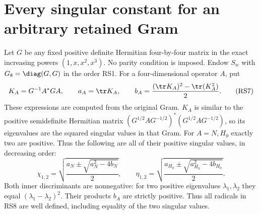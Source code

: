 \section{Every singular constant for an arbitrary retained Gram}
Let $G$ be any fixed positive definite Hermitian four-by-four
matrix in the exact increasing powers $(1,x,x^2,x^3)$.
No parity condition is imposed. Endow $S_w$ with
$G_8=\diag(G,G)$ in the order RS1. For a four-dimensional
operator $A$, put
\begin{equation}
 K_A=G^{-1}A^*GA,\qquad
 a_A=\tr K_A,\qquad
 b_A=\frac{(\tr K_A)^2-\tr(K_A^2)}2.
 \tag{RS7}
\end{equation}
These expressions are computed from the original Gram.
$K_A$ is similar to the positive semidefinite Hermitian matrix
$(G^{1/2}AG^{-1/2})^*(G^{1/2}AG^{-1/2})$, so its eigenvalues
are the squared singular values in that Gram. For $A=N,H_0$
exactly two are positive. Thus the following are all of their
positive singular values, in decreasing order:
\begin{equation}
 \chi_{1,2}=
 \sqrt{\frac{a_N\pm\sqrt{a_N^2-4b_N}}2},\qquad
 \eta_{1,2}=
 \sqrt{\frac{a_{H_0}\pm\sqrt{a_{H_0}^2-4b_{H_0}}}2}.
 \tag{RS8}
\end{equation}
Both inner discriminants are nonnegative: for two positive
eigenvalues $\lambda_1,\lambda_2$ they equal
$(\lambda_1-\lambda_2)^2$. Their products $b_A$ are strictly
positive. Thus all radicals in RS8 are well defined, including
equality of the two singular values.

